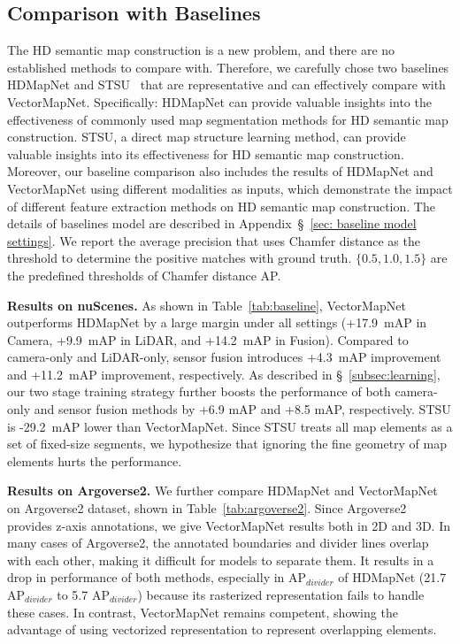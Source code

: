 \documentclass{article}
\theoremstyle{plain}
\theoremstyle{definition}
\theoremstyle{remark}
\begin{document}
\subsection{Comparison with Baselines}
\label{sec:baseline}
The HD semantic map construction is a new problem, and there are no established methods to compare with. Therefore, we carefully chose two baselines HDMapNet and STSU~\citep{can2021structured} that are representative and can effectively compare with VectorMapNet. Specifically: HDMapNet can provide valuable insights into the effectiveness of commonly used map segmentation methods for HD semantic map construction. STSU, a direct map structure learning method, can provide valuable insights into its effectiveness for HD semantic map construction. Moreover, our baseline comparison also includes the results of HDMapNet and VectorMapNet using different modalities as inputs, which demonstrate the impact of different feature extraction methods on HD semantic map construction. The details of baselines model are described in Appendix~\S~\ref{sec: baseline model settings}. We report the average precision that uses Chamfer distance as the threshold to determine the positive matches with ground truth. $\{ 0.5, 1.0, 1.5 \}$ are the predefined thresholds of Chamfer distance AP. 

\noindent\textbf{Results on nuScenes.} As shown in Table~\ref{tab:baseline}, VectorMapNet outperforms HDMapNet by a large margin under all settings (+17.9~mAP in Camera, +9.9~mAP in LiDAR, and +14.2~mAP in Fusion). Compared to camera-only and LiDAR-only, sensor fusion introduces +4.3~mAP improvement and +11.2~mAP improvement, respectively.
As described in \S~\ref{subsec:learning}, our two stage training strategy further boosts the performance of both camera-only and sensor fusion methods by +6.9 mAP and +8.5 mAP, respectively.
STSU is -29.2~mAP lower than VectorMapNet. Since STSU treats all map elements as a set of fixed-size segments, we hypothesize that ignoring the fine geometry of map elements hurts the performance. 

\noindent\textbf{Results on Argoverse2.} We further compare HDMapNet and VectorMapNet on Argoverse2 dataset, shown in Table~\ref{tab:argoverse2}.
Since Argoverse2 provides z-axis annotations, we give VectorMapNet results both in 2D and 3D.
In many cases of Argoverse2, the annotated boundaries and divider lines overlap with each other, making it difficult for models to separate them. It results in a drop in performance of both methods, especially in AP$_{divider}$ of HDMapNet (21.7 AP$_{divider}$ to 5.7 AP$_{divider}$) because its rasterized representation fails to handle these cases. In contrast, VectorMapNet remains competent, showing the advantage of using vectorized representation to represent overlapping elements.
\end{document}
